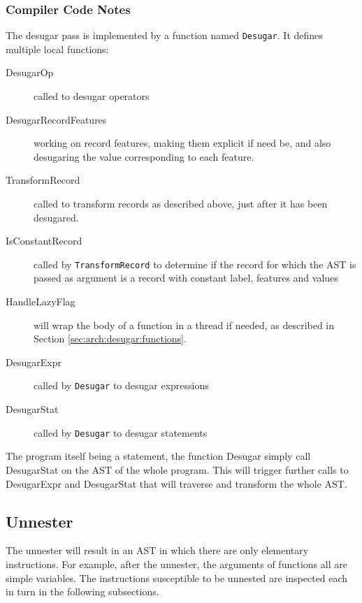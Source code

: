 \documentclass[a4paper]{memoir}
\begin{document}
\subsubsection{Compiler Code Notes}
The desugar pass is implemented by a function named \lstinline!Desugar!. It defines multiple local functions:
\begin{description}
  \item[DesugarOp] called to desugar operators
  \item[DesugarRecordFeatures] working on record features, making them explicit if need be, and also desugaring the value corresponding to each feature.
  \item[TransformRecord] called to transform records as described above, just after it has been desugared.
  \item[IsConstantRecord] called by \lstinline!TransformRecord! to determine if the record for which the AST is passed as argument is a record with constant label, features and values
  \item[HandleLazyFlag] will wrap the body of a function in a thread if needed, as described in Section \ref{sec:arch:desugar:functions}.
  \item[DesugarExpr] called by \lstinline!Desugar! to desugar expressions
  \item[DesugarStat] called by \lstinline!Desugar! to desugar statements
\end{description}

The program itself being a statement, the function Desugar simply call DesugarStat on the AST of the whole program. This will trigger further calls to DesugarExpr and DesugarStat that will traverse and transform the whole AST.

\subsection{Unnester}\label{sec:arch:unnester}
The unnester will result in an AST in which there are only elementary instructions. For example, after the unnester, the arguments of functions all are simple variables. The instructions susceptible to be unnested are inspected each in turn in the following subsections.
\end{document}
